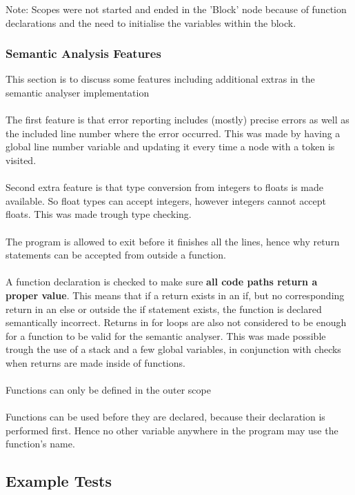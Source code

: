 Note: Scopes were not started and ended in the 'Block' node because of function declarations and the need to initialise the variables within the block.

\subsubsection{Semantic Analysis Features}
This section is to discuss some features including additional extras in the semantic analyser implementation
\\\\
The first feature is that error reporting includes (mostly) precise errors as well as the included line number where the error occurred. This was made by having a global line number variable and updating it every time a node with a token is visited.
\\\\
Second extra feature is that type conversion from integers to floats is made available. So float types can accept integers, however integers cannot accept floats. This was made trough type checking.
\\\\
The program is allowed to exit before it finishes all the lines, hence why return statements can be accepted from outside a function.
\\\\
A function declaration is checked to make sure \textbf{all code paths return a proper value}. This means that if a return exists in an if, but no corresponding return in an else or outside the if statement exists, the function is declared semantically incorrect. Returns in for loops are also not considered to be enough for a function to be valid for the semantic analyser. This was made possible trough the use of a stack and a few global variables, in conjunction with checks when returns are made inside of functions.
\\\\
Functions can only be defined in the outer scope
\\\\ 
Functions can be used before they are declared, because their declaration is performed first. Hence no other variable anywhere in the program may use the function's name.

\subsection{Example Tests}

